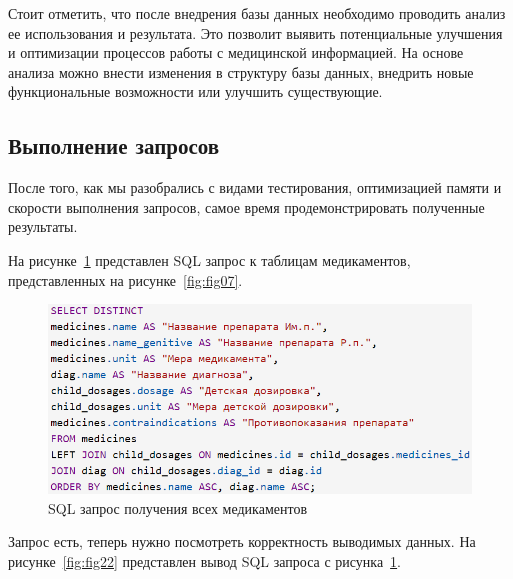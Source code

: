 Стоит отметить, что после внедрения базы данных необходимо проводить анализ ее использования и результата. Это позволит выявить потенциальные улучшения и оптимизации процессов работы с медицинской информацией. На основе анализа можно внести изменения в структуру базы данных, внедрить новые функциональные возможности или улучшить существующие.



\subsection{Выполнение запросов}

После того, как мы разобрались с видами тестирования, оптимизацией памяти и скорости выполнения запросов, самое время продемонстрировать полученные результаты.

На рисунке~\ref{fig:fig21} представлен SQL запрос к таблицам медикаментов, представленных на рисунке~\ref{fig:fig07}.

\begin{figure}
  \includegraphics[scale=0.78]{inc/sh_all_ch_med}
  \caption{SQL запрос получения всех медикаментов}
  \label{fig:fig21}
\end{figure}

Запрос есть, теперь нужно посмотреть корректность выводимых данных. На рисунке~\ref{fig:fig22} представлен вывод SQL запроса с рисунка~\ref{fig:fig21}.

